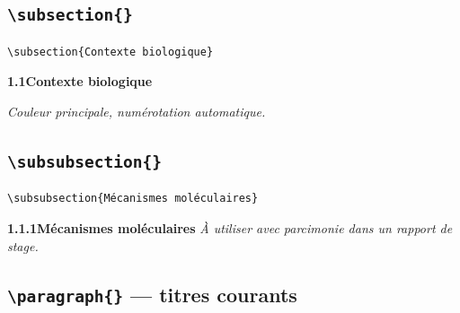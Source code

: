 \documentclass[12pt, a4paper]{article}
\newcommand{\simsubsection}[2][1.1]{%
  {\color{ENSorange}\sffamily\bfseries #1\enspace #2}\par}
\begin{document}
\subsection{\texttt{\textbackslash subsection\{\}}}

\begin{demo}
\begin{lstlisting}[style=latexcode]
\subsection{Contexte biologique}
\end{lstlisting}
\tcblower
\simsubsection[1.1]{Contexte biologique}
\vspace{4pt}
{\footnotesize\itshape Couleur principale, numérotation automatique.}
\end{demo}

\subsection{\texttt{\textbackslash subsubsection\{\}}}

\begin{demo}
\begin{lstlisting}[style=latexcode]
\subsubsection{Mécanismes moléculaires}
\end{lstlisting}
\tcblower
{\small\sffamily\bfseries 1.1.1\enspace Mécanismes moléculaires}
\vspace{4pt}
{\footnotesize\itshape À utiliser avec parcimonie dans un rapport de stage.}
\end{demo}

\subsection{\texttt{\textbackslash paragraph\{\}} — titres courants}
\end{document}

